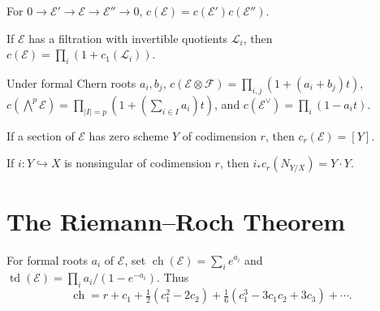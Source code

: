 \begin{convention}
\label{ha-appA-C3}
For $0\to\mathcal E'\to\mathcal E\to\mathcal E''\to0$,
$c(\mathcal E)=c(\mathcal E')c(\mathcal E'')$.
\end{convention}

\begin{convention}
\label{ha-appA-C4}
If $\mathcal E$ has a filtration with invertible quotients $\mathcal L_i$,
then $c(\mathcal E)=\prod_i(1+c_1(\mathcal L_i))$.
\end{convention}

\begin{convention}
\label{ha-appA-C5}
Under formal Chern roots $a_i,b_j$,
$c(\mathcal E\otimes\mathcal F)=\prod_{i,j}(1+(a_i+b_j)t)$,
$c(\bigwedge^p\mathcal E)=\prod_{|I|=p}(1+(\sum_{i\in I}a_i)t)$, and
$c(\mathcal E^\vee)=\prod_i(1-a_it)$.
\end{convention}

\begin{convention}
\label{ha-appA-C6}
If a section of $\mathcal E$ has zero scheme $Y$ of codimension $r$, then
$c_r(\mathcal E)=[Y]$.
\end{convention}

\begin{convention}
\label{ha-appA-C7}
If $i:Y\hookrightarrow X$ is nonsingular of codimension $r$, then
$i_*c_r(N_{Y/X})=Y\cdot Y$.
\end{convention}

\section{The Riemann--Roch Theorem}
\label{ha-appA-sec4}

\begin{definition}
For formal roots $a_i$ of $\mathcal E$, set
$\operatorname{ch}(\mathcal E)=\sum_i e^{a_i}$ and
$\operatorname{td}(\mathcal E)=\prod_i a_i/(1-e^{-a_i})$.  Thus
\[
\operatorname{ch}=r+c_1+\tfrac12(c_1^2-2c_2)+\tfrac16(c_1^3-3c_1c_2+3c_3)+\cdots.
\]
\end{definition}

